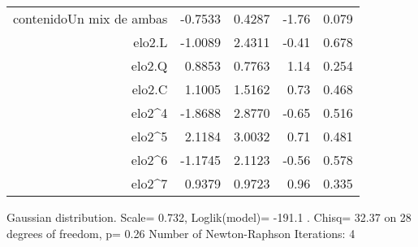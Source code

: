 \documentclass[11pt]{article}
\begin{document}
\begin{center}
\begin{table}[ht]
\begin{tabular}{rrrrr}
$$contenidoUn mix de ambas                                  &-0.7533     &0.4287  &-1.76    &0.079\\
elo2.L                                                    &-1.0089     &2.4311  &-0.41    &0.678\\
elo2.Q                                                     &0.8853     &0.7763   &1.14    &0.254\\
elo2.C                                                     &1.1005     &1.5162   &0.73    &0.468\\
elo2^4                                                    &-1.8688     &2.8770  &-0.65    &0.516\\
elo2^5                                                     &2.1184     &3.0032   &0.71    &0.481\\
elo2^6                                                    &-1.1745     &2.1123  &-0.56    &0.578\\
elo2^7                                                     &0.9379     &0.9723   &0.96    &0.335\\
    \hline
   \end{tabular}
   \end{table}
\tiny{Gaussian distribution. Scale= 0.732, Loglik(model)= -191.1 . Chisq= 32.37 on 28 degrees of freedom, p=  0.26   Number of Newton-Raphson Iterations: 4}
\end{center} 
\end{document}
